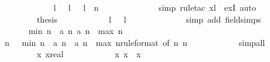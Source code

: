 \begin{isabellebody}
\ \ \ \ \ \ \ \ \ \ \ \ \isamarkupfalse%
\ {\isacharbackquoteopen}l\ {\isasymnoteq}\ {}{\isacharbackquoteclose}\ {\isacharbackquoteopen}l\ {\isasymge}\ {}{\isacharbackquoteclose}\ {\isacharbackquoteopen}l\ {\isasymle}\ n{\isacharbackquoteclose}\isanewline
\ \ \ \ \ \ \ \ \ \ \ \ \isamarkupfalse%
\ simp\ {\isacharparenleft}rule{\isacharunderscore}tac\ x{\isacharequal}{\isachardoublequoteopen}l{\isacharminus}{}{\isachardoublequoteclose}\ \ exI{\isacharcomma}\ auto{\isacharparenright}\isanewline
\ \ \ \ \ \ \ \ \isamarkupfalse%
\isanewline
\ \ \ \ \ \ \ \ \isamarkupfalse%
\ {\isacharquery}thesis\isanewline
\ \ \ \ \ \ \ \ \ \ \isamarkupfalse%
\ {\isacharbackquoteopen}l\ {\isasymge}\ {}{\isacharbackquoteclose}\ {\isacharbackquoteopen}l\ {\isasymnoteq}\ {}{\isacharbackquoteclose}\isanewline
\ \ \ \ \ \ \ \ \ \ \isamarkupfalse%
\ {\isacharparenleft}simp\ add{\isacharcolon}\ field{\isacharunderscore}simps{\isacharparenright}\isanewline
\ \ \ \ \ \ \isamarkupfalse%
\isanewline
\isanewline
\ \ \ \ \ \ \isamarkupfalse%
\ {\isachardoublequoteopen}{\isacharquery}min\ {\isacharparenleft}n{\isacharminus}{}{\isacharparenright}\ {\isasymle}\ a\ {\isacharparenleft}n{\isacharminus}{}{\isacharparenright}{\isachardoublequoteclose}\ {\isachardoublequoteopen}a\ {\isacharparenleft}n{\isacharminus}{}{\isacharparenright}\ {\isasymle}\ {\isacharquery}max\ {\isacharparenleft}n{\isacharminus}{}{\isacharparenright}{\isachardoublequoteclose}\isanewline
\ \ \ \ \ \ \ \ \isamarkupfalse%
\ {\isacharbackquoteopen}{\isasymforall}\ n\ {\isasymge}\ {}{\isachardot}\ {\isacharquery}min\ n\ {\isasymle}\ a\ n\ {\isasymand}\ a\ n\ {\isasymle}\ {\isacharquery}max\ n{\isacharbackquoteclose}{\isacharbrackleft}rule{\isacharunderscore}format{\isacharcomma}\ of\ {\isachardoublequoteopen}n{\isacharminus}{}{\isachardoublequoteclose}{\isacharbrackright}\ {\isacharbackquoteopen}n\ {\isachargreater}\ {}{\isacharbackquoteclose}\isanewline
\ \ \ \ \ \ \ \ \isamarkupfalse%
\ simp{\isacharunderscore}all\isanewline
\isanewline
\ \ \ \ \ \ \isacommand{{\isacharbraceleft}}\isamarkupfalse%
\isanewline
\ \ \ \ \ \ \ \ \isamarkupfalse%
\ x{}\ x{}{\isacharcolon}{\isacharcolon}real\isanewline
\ \ \ \ \ \ \ \ \isamarkupfalse%
\ {\isachardoublequoteopen}{}\ {\isacharless}\ x{}{\isachardoublequoteclose}\ {\isachardoublequoteopen}x{}\ {\isasymle}\ x{}{\isachardoublequoteclose}\isanewline

\end{isabellebody}
